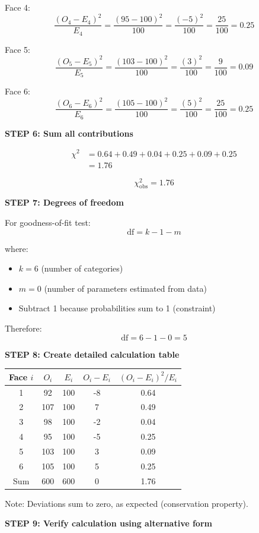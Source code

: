 \documentclass[12pt]{article}
\begin{document}
\begin{solution}
Face 4:
\[
\frac{(O_4 - E_4)^2}{E_4} = \frac{(95 - 100)^2}{100} = \frac{(-5)^2}{100} = \frac{25}{100} = 0.25
\]

Face 5:
\[
\frac{(O_5 - E_5)^2}{E_5} = \frac{(103 - 100)^2}{100} = \frac{(3)^2}{100} = \frac{9}{100} = 0.09
\]

Face 6:
\[
\frac{(O_6 - E_6)^2}{E_6} = \frac{(105 - 100)^2}{100} = \frac{(5)^2}{100} = \frac{25}{100} = 0.25
\]

\textbf{STEP 6: Sum all contributions}

\begin{align*}
\chi^2 &= 0.64 + 0.49 + 0.04 + 0.25 + 0.09 + 0.25 \\
&= 1.76
\end{align*}

\[
\boxed{\chi^2_{\text{obs}} = 1.76}
\]

\textbf{STEP 7: Degrees of freedom}

For goodness-of-fit test:
\[
\text{df} = k - 1 - m
\]

where:
\begin{itemize}
    \item $k = 6$ (number of categories)
    \item $m = 0$ (number of parameters estimated from data)
    \item Subtract 1 because probabilities sum to 1 (constraint)
\end{itemize}

Therefore:
\[
\text{df} = 6 - 1 - 0 = 5
\]

\textbf{STEP 8: Create detailed calculation table}

\begin{center}
\begin{tabular}{c|c|c|c|c}
Face $i$ & $O_i$ & $E_i$ & $O_i - E_i$ & $(O_i - E_i)^2/E_i$ \\
\hline
1 & 92 & 100 & -8 & 0.64 \\
2 & 107 & 100 & 7 & 0.49 \\
3 & 98 & 100 & -2 & 0.04 \\
4 & 95 & 100 & -5 & 0.25 \\
5 & 103 & 100 & 3 & 0.09 \\
6 & 105 & 100 & 5 & 0.25 \\
\hline
Sum & 600 & 600 & 0 & 1.76
\end{tabular}
\end{center}

Note: Deviations sum to zero, as expected (conservation property).

\textbf{STEP 9: Verify calculation using alternative form}


\end{solution}
\end{document}

